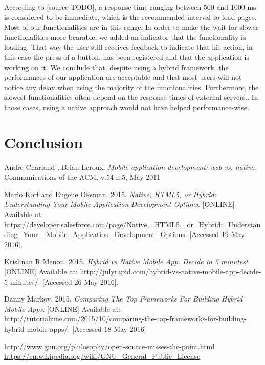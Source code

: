 \documentclass{eplmastersthesis}
\begin{document}
According to [source TODO], a response time ranging between 500 and 1000 ms is considered to be immediate, which is the recommended interval to load pages. Most of our functionalities are in this range. In order to make the wait for slower functionalities more bearable, we added an indicator that the functionality is loading. That way the user still receives feedback to indicate that his action, in this case the press of a button, has been registered and that the application is working on it. 
We conclude that, despite using a hybrid framework, the performances of our application are acceptable and that most users will not notice any delay when using the majority of the functionalities. Furthermore, the slowest functionalities often depend on the response times of external servers.. In those cases, using a native approach would not have helped performance-wise. 
\chapter{Conclusion} 

\begin{thebibliography}{9}

\bibitem{} 
Andre Charland , Brian Leroux.
\textit{Mobile application development: web vs. native}. 
Communications of the ACM, v.54 n.5, May 2011  

\bibitem{} 
Mario Korf and Eugene Oksman. 2015.
\textit{Native, HTML5, or Hybrid: Understanding Your Mobile Application Development Options}.
[ONLINE] Available at: https://developer.salesforce.com/page/Native,\_HTML5,\_or\_Hybrid:\_Understanding\_Your
\_Mobile\_Application\_Development\_Options. [Accessed 19 May 2016].


\bibitem{} 
Krishnan R Menon. 2015.
\textit{Hybrid vs Native Mobile App. Decide in 5 minutes!}.
[ONLINE] Available at: http://julyrapid.com/hybrid-vs-native-mobile-app-decide-5-minutes/. [Accessed 26 May 2016].
 
\bibitem{} 
Danny Markov. 2015.
\textit{Comparing The Top Frameworks For Building Hybrid Mobile Apps}.
[ONLINE] Available at: http://tutorialzine.com/2015/10/comparing-the-top-frameworks-for-building-hybrid-mobile-apps/. [Accessed 18 May 2016].

\end{thebibliography}
\url{http://www.gnu.org/philosophy/open-source-misses-the-point.html}\\
\url{https://en.wikipedia.org/wiki/GNU_General_Public_License}\\

\backcoverpage
\end{document}
